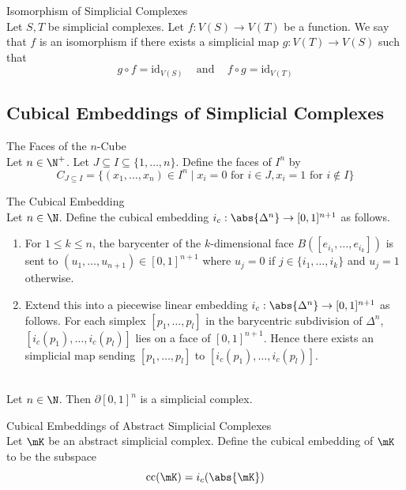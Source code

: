 \documentclass[a4paper]{article}
\begin{document}
\begin{defn}{Isomorphism of Simplicial Complexes}{}\\
Let $S,T$ be simplicial complexes. Let $f:V(S)\to V(T)$ be a function. We say that $f$ is an isomorphism if there exists a simplicial map $g:V(T)\to V(S)$ such that $$g\circ f=\text{id}_{V(S)}\;\;\;\text{ and }\;\;\;f\circ g=\text{id}_{V(T)}$$
\end{defn}

\subsection{Cubical Embeddings of Simplicial Complexes}
\begin{defn}{The Faces of the $n$-Cube}{}\\
Let $n\in\N^+$. Let $J\subseteq I\subseteq\{1,\dots,n\}$. Define the faces of $I^n$ by $$C_{J\subseteq I}=\{(x_1,\dots,x_n)\in I^n\;|\;x_i=0\text{ for }i\in J,x_i=1\text{ for }i\notin I\}$$
\end{defn}

\begin{defn}{The Cubical Embedding}{}\\
Let $n\in\N$. Define the cubical embedding $i_c:\abs{\Delta^n}\to[0,1]^{n+1}$ as follows. 
\begin{enumerate}
\item For $1\leq k\leq n$, the barycenter of the $k$-dimensional face $B([e_{i_1},\dots,e_{i_k}])$ is sent to $(u_1,\dots,u_{n+1})\in[0,1]^{n+1}$ where $u_j=0$ if $j\in\{i_1,\dots,i_k\}$ and $u_j=1$ otherwise. 
\item Extend this into a piecewise linear embedding $i_c:\abs{\Delta^n}\to[0,1]^{n+1}$ as follows. For each simplex $[p_1,\dots,p_l]$ in the barycentric subdivision of $\Delta^n$, $[i_c(p_1),\dots,i_c(p_l)]$ lies on a face of $[0,1]^{n+1}$. Hence there exists an simplicial map sending $[p_1,\dots,p_l]$ to $[i_c(p_1),\dots,i_c(p_l)]$. 
\end{enumerate}
\end{defn}

\begin{lmm}{}{}\\
Let $n\in\N$. Then $\partial[0,1]^n$ is a simplicial complex. 
\end{lmm}

\begin{defn}{Cubical Embeddings of Abstract Simplicial Complexes}{}\\
Let $\mK$ be an abstract simplicial complex. Define the cubical embedding of $\mK$ to be the subspace $$\text{cc}(\mK)=i_c(\abs{\mK})$$
\end{defn}
\end{document}
